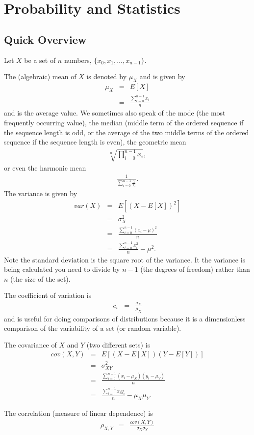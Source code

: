 \chapter{Probability and Statistics}\label{ch-stats}

\section{Quick Overview}
Let $X$ be a set of $n$ numbers, $\{x_0, x_1, \ldots, x_{n-1}\}$.

The (algebraic) mean of $X$ is denoted by $\mu_X$ and is given by
\begin{eqnarray}
\mu_X &=& E[X] \\
&=& \frac{\sum_{i=0}^{n-1}x_i}{n}
\end{eqnarray}
and is the average value.  We sometimes also speak of the mode (the most frequently occurring value), the median (middle term of the ordered sequence if the sequence length is odd, or the average of the two middle terms of the ordered sequence if the sequence length is even), the geometric mean
\begin{eqnarray}
\sqrt[n]{\prod_{i=0}^{n-1}x_i},
\end{eqnarray}
or even the harmonic mean 
\begin{eqnarray}
\frac{1}{\sum_{i=0}^{n-1}\frac{1}{x_i}}.
\end{eqnarray}
The variance is given by
\begin{eqnarray}
var(X) &=& E[(X-E[X])^2] \\
&=& \sigma_X^2 \\
&=& \frac{\sum_{i=0}^{n-1}(x_i-\mu)^2}{n}\\
&=& \frac{\sum_{i=0}^{n-1}x_i^2}{n}-\mu^2.
\end{eqnarray}
Note the standard deviation is the square root of the variance.  It the variance is being calculated you need to divide by $n-1$ (the degrees of freedom) rather than $n$ (the size of the set).  

The coefficient of variation is
\begin{eqnarray}
c_v &=& \frac{\sigma_X}{\mu_X}
\end{eqnarray}
and is useful for doing comparisons of distributions because it is a dimensionless comparison of the variability of a set (or random variable).


The covariance of $X$ and $Y$ (two different sets) is
\begin{eqnarray}
cov(X,Y) &=& E[(X-E[X])(Y-E[Y])] \\
&=& \sigma_{XY}^2 \\
&=& \frac{\sum_{i=0}^{n-1}(x_i-\mu_X)(y_i-\mu_Y)}{n}\\
&=& \frac{\sum_{i=0}^{n-1}x_iy_i}{n}-\mu_X\mu_Y.
\end{eqnarray}

The correlation (measure of linear dependence) is
\begin{eqnarray}
\rho_{X,Y} &=& \frac{cov(X,Y)}{\sigma_X\sigma_Y}
\end{eqnarray}
